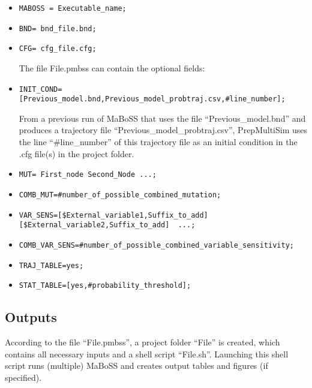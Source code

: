 \documentclass{article}
\begin{document}
\begin{itemize}

  \item \begin{verbatim}MABOSS = Executable_name;\end{verbatim}
  \item  \begin{verbatim}BND= bnd_file.bnd;\end{verbatim}
  \item  \begin{verbatim}CFG= cfg_file.cfg;\end{verbatim}

The file File.pmbss can contain the optional fields:

\item    \begin{verbatim}INIT_COND=[Previous_model.bnd,Previous_model_probtraj.csv,#line_number];\end{verbatim}
From a previous run of MaBoSS that uses the file ``Previous\_model.bnd'' and produces a trajectory file ``Previous\_model\_probtraj.csv'', PrepMultiSim uses the line ``\#line\_number'' of this trajectory file as an initial condition in the .cfg file(s) in the project folder.
\item    \begin{verbatim}MUT= First_node Second_Node ...;\end{verbatim}
\item    \begin{verbatim}COMB_MUT=#number_of_possible_combined_mutation;\end{verbatim}
\item    \begin{verbatim}VAR_SENS=[$External_variable1,Suffix_to_add] [$External_variable2,Suffix_to_add]  ...;\end{verbatim}
\item    \begin{verbatim}COMB_VAR_SENS=#number_of_possible_combined_variable_sensitivity;\end{verbatim}
\item    \begin{verbatim}TRAJ_TABLE=yes;\end{verbatim}
\item    \begin{verbatim}STAT_TABLE=[yes,#probability_threshold];\end{verbatim}

\end{itemize} 

\subsection*{Outputs}

According to the file ``File.pmbss'', a project folder ``File'' is created, which contains all necessary inputs and a shell script ``File.sh''. Launching this shell script runs (multiple) MaBoSS and creates output tables and figures (if specified).
\end{document}
